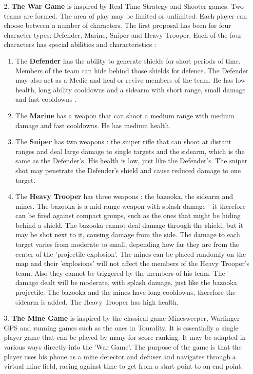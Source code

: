 \documentclass{article}
\begin{document}
2. \textbf{The War Game} is inspired by Real Time Strategy and Shooter games.
Two teams are formed. The area of play may be limited or unlimited. Each
player can choose between a number of characters. The first proposal has been
for four character types: Defender, Marine, Sniper and Heavy Trooper. Each of
the four characters has special abilities and characteristics :
\begin{enumerate}
	
	\item The \textbf{Defender} has the ability to generate shields for short
	periods of time. Members of the team can hide behind those shields for defence.
	The Defender may also act as a Medic and heal or revive members of the team. He
	has low health, long ability cooldowns and a sidearm with short range, small
	damage and fast cooldowns .
	
	\item The \textbf{Marine} has a weapon that can shoot a medium range with
	medium damage and fast cooldowns. He has medium health. 
	
	\item The \textbf{Sniper} has two weapons : the sniper rifle that can shoot at
	distant ranges and deal large damage to single targets and the sidearm, which
	is the same as the Defender's. His health is low, just like the Defender's. The
	sniper shot may penetrate the Defender's shield and cause reduced damage to one
	target.	
	
	\item The \textbf{Heavy Trooper} has three weapons : the bazooka, the sidearm
	and mines. The bazooka is a mid-range weapon with splash damage - it therefore
	can be fired against compact groups, such as the ones that might be hiding
	behind a shield. The bazooka cannot deal damage through the shield, but it may
	be shot next to it, causing damage from the side. The damage to each target
	varies from moderate to small, depending how far they are from the center of
	the 'projectile explosion'. The mines can be placed randomly on the map and
	their 'explosions' will not affect the members of the Heavy Trooper's team.
	Also they cannot be triggered by the members of his team. The damage dealt will
	be moderate, with splash damage, just like the bazooka projectile. The bazooka
	and the mines have long cooldowns, therefore the sidearm is added. The Heavy
	Trooper has high health.
	 
\end{enumerate}


3. \textbf{The Mine Game} is inspired by the classical game Minesweeper,
Warfinger GPS and running games such as the ones in Tourality. It is essentially
a single player game that can be played by many for score ranking. It may be
adapted in various ways directly into the 'War Game'. The purpose of the game is
that the player uses his phone as a mine detector and defuser and navigates
through a virtual mine field, racing against time to get from a start point to
an end point.\newline
\end{document}
